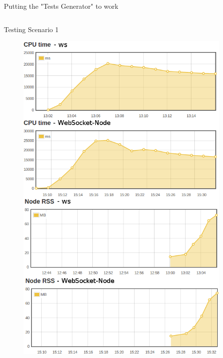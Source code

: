 \documentclass{soa.cs.pub.ro}
\begin{document}
\begin{frame}{Putting the "Tests Generator" to work}
  \begin{columns}
    \begin{column}[l]{0.45\textwidth}
      \begin{center}
        Testing Scenario 1
      \end{center}
      \begin{figure}
         \includegraphics[scale=0.18]{img/test1v2.png}
      \end{figure}
    \end{column}
    \begin{column}[l]{0.45\textwidth}
      \begin{center}

\end{center}
\end{column}
\end{columns}
\end{frame}
\end{document}
